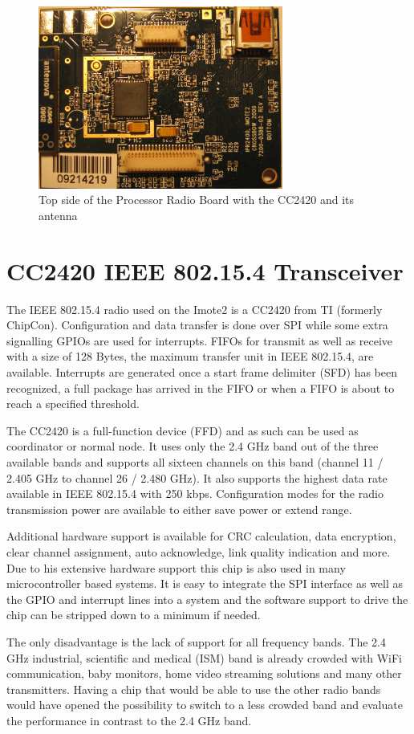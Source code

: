 \begin{figure}
  \begin{center}
    \includegraphics[height=6cm]{images/imote_top_cutted}
    \caption{Top side of the Processor Radio Board with the CC2420 and its antenna}
        \label{fig:imote2top}
  \end{center}
\end{figure}

\section{CC2420 IEEE 802.15.4 Transceiver}
\label{cc2420}
The IEEE 802.15.4 radio used on the Imote2 is a CC2420 from TI (formerly ChipCon).
Configuration and data transfer is done over SPI while some extra signalling
GPIOs are used for interrupts. FIFOs for transmit as well as receive with a size
of 128 Bytes, the maximum transfer unit in IEEE 802.15.4, are available. Interrupts
are generated once a start frame delimiter (SFD) has been recognized, a full package
has arrived in the FIFO or when a FIFO is about to reach a specified threshold.

The CC2420 is a full-function device (FFD) and as such can be used as
coordinator or normal node. It uses only the 2.4 GHz band out of the three
available bands and supports all sixteen channels on this band (channel 11 / 2.405 GHz
to channel 26 / 2.480 GHz). It also supports the highest data rate available
in IEEE 802.15.4 with 250 kbps. Configuration modes for the radio transmission power
are available to either save power or extend range.

Additional hardware support is available for CRC calculation, data encryption, clear
channel assignment, auto acknowledge, link quality indication and more. Due to
his extensive hardware support this chip is also used in many microcontroller
based systems. It is easy to integrate the SPI interface as well as the GPIO and
interrupt lines into a system and the software support to drive the chip can be
stripped down to a minimum if needed.

The only disadvantage is the lack of support for all frequency bands. The 2.4 GHz
industrial, scientific and medical (ISM) band is already crowded with WiFi
communication, baby monitors, home video streaming solutions and many other
transmitters. Having a chip that would be able to use the other radio bands
would have opened the possibility to switch to a less crowded band and evaluate
the performance in contrast to the 2.4 GHz band.
